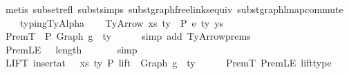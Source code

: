 \begin{isabellebody}
\ {\isacharparenleft}{\kern0pt}metis\ subset{\isacharunderscore}{\kern0pt}refl\ subst{\isachardot}{\kern0pt}simps{\isacharparenleft}{\kern0pt}{}{\isacharparenright}{\kern0pt}\ subst{\isacharunderscore}{\kern0pt}graph{\isacharunderscore}{\kern0pt}freelinks{\isacharunderscore}{\kern0pt}equiv\ subst{\isacharunderscore}{\kern0pt}graph{\isacharunderscore}{\kern0pt}lmap{\isacharunderscore}{\kern0pt}commute\isanewline
\ \ \ \ typing{\isachardot}{\kern0pt}TyAlpha{\isacharparenright}{\kern0pt}\isanewline
{}\isamarkupfalse%
\isanewline
\ \ \isamarkupfalse%
\ {\isacharparenleft}{\kern0pt}TyArrow\ xs{\isacharprime}{\kern0pt}\ ty{}{\isacharprime}{\kern0pt}\ {\isasymGamma}{\isacharprime}{\kern0pt}\ P\ e{\isacharprime}{\kern0pt}\ ty{}{\isacharprime}{\kern0pt}\ ys{\isacharprime}{\kern0pt}{\isacharparenright}{\kern0pt}\isanewline
\isanewline
\ \ \isamarkupfalse%
\ PremT{\isacharcolon}{\kern0pt}\ {\isachardoublequoteopen}{\isasymGamma}{}\ {\isasymturnstile}{\isacharbraceleft}{\kern0pt}P{\isacharbraceright}{\kern0pt}\ {\isacharparenleft}{\kern0pt}Graph\ g{}{\isacharparenright}{\kern0pt}\ {\isacharcolon}{\kern0pt}\ ty{}{\isachardoublequoteclose}\isanewline
\ \ \ \ \isamarkupfalse%
\ {\isacharparenleft}{\kern0pt}simp\ add{\isacharcolon}{\kern0pt}\ TyArrow{\isachardot}{\kern0pt}prems{\isacharparenleft}{\kern0pt}{}{\isacharparenright}{\kern0pt}{\isacharparenright}{\kern0pt}\isanewline
\ \ \isamarkupfalse%
\ PremLE{\isacharcolon}{\kern0pt}\ {\isachardoublequoteopen}{}\ {\isasymle}\ length\ {\isasymGamma}{}{\isachardoublequoteclose}\isanewline
\ \ \ \ \isamarkupfalse%
\ simp\isanewline
\isanewline
\ \ \isamarkupfalse%
\ \isamarkupfalse%
\ LIFT{}{\isacharcolon}{\kern0pt}\ {\isachardoublequoteopen}insert{\isacharunderscore}{\kern0pt}at\ {\isasymGamma}{}\ {}\ {\isacharparenleft}{\kern0pt}xs{\isacharprime}{\kern0pt}{\isacharcomma}{\kern0pt}\ ty{}{\isacharprime}{\kern0pt}{\isacharparenright}{\kern0pt}\ {\isasymturnstile}{\isacharbraceleft}{\kern0pt}P{\isacharbraceright}{\kern0pt}\ {\isacharparenleft}{\kern0pt}lift\ {}\ {\isacharparenleft}{\kern0pt}Graph\ g{}{\isacharparenright}{\kern0pt}{\isacharparenright}{\kern0pt}\ {\isacharcolon}{\kern0pt}\ ty{}{\isachardoublequoteclose}\isanewline
\ \ \ \ \isamarkupfalse%
\ PremT\ PremLE\ lift{\isacharunderscore}{\kern0pt}type\isanewline

\end{isabellebody}
